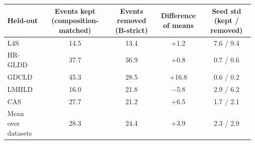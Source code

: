 \begin{tabular}{lcccc}
\toprule
Held-out & Events kept (composition-matched) & Events removed (B-strict) & Difference of means & Seed std (kept / removed) \\
\midrule
L4S & 14.5 & 13.4 & +1.2 & 7.6 / 9.4 \\
HR-GLDD & 37.7 & 36.9 & +0.8 & 0.7 / 0.6 \\
GDCLD & 45.3 & 28.5 & +16.8 & 0.6 / 0.2 \\
LMHLD & 16.0 & 21.8 & $-$5.8 & 2.9 / 6.2 \\
CAS & 27.7 & 21.2 & +6.5 & 1.7 / 2.1 \\
\midrule
Mean over datasets & 28.3 & 24.4 & +3.9 & 2.3 / 2.9 \\
\bottomrule
\end{tabular}
